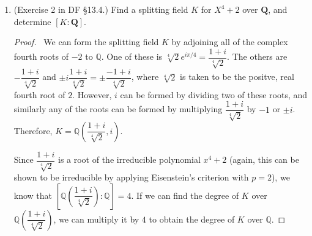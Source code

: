 \documentclass[10pt]{article}
\newcommand{\Q}{\mathbb{Q}}
\begin{document}
\begin{enumerate}[leftmargin=0cm,itemindent=.5cm,labelwidth=\itemindent,labelsep=0cm,align=left]
\begin{proof}
Define a map $\varphi : \dfrac{F[x]}{\big(f(x) \big)} \rightarrow \dfrac{F[x]}{\big(h(x) \big)}$ by $\overline{p(x)} \mapsto \overline{p(g(x))}$.  To show this map is well-defined, assume $p(x) \in \big( f(x) \big)$, so that $p(x) = r(x)f(x)$ for some $r(x) \in F[x]$.  Thus, $p(g(x)) = r(g(x))f(g(x)) \in \big( h(x) \big)$ because $h(x) \mid f(g(x))$.

It is clear that $\varphi$ is a ring homomorphism: for any $p(x), q(x), r(x) \in F[x]$ we have $\varphi(p(x)q(x) + r(x)) = p(g(x))q(g(x)) + r(g(x)) = \varphi(p(x))\varphi(q(x)) + \varphi(r(x))$.

Now, assume for a contradiction that $\varphi$ is the zero map.  Then for the polynomial $p(x) = 1$, we have $\varphi(\overline{p(x)}) = \overline{p(g(x))} = \overline{1} = \big( h(x) \big)$.  So $h(x)$ is a unit in $F[x]$ and thus a constant polynomial, contraditing that it is irreducible.  So $\varphi$ is injective, and thus an isomorphism onto a subfield of $\dfrac{F[x]}{\big(h(x) \big)}$.  By the argument in the first paragraph, this completes the proof.

\end{proof}

\item (Exercise 2 in DF \S 13.4.) Find a splitting field $K$ for $X^4+2$ over $\mathbf{Q}$, and determine $[K:\mathbf{Q}]$.

\begin{proof}

\ We can form the splitting field $K$ by adjoining all of the complex fourth roots of $-2$ to $\Q$.  One of these is $\sqrt[4]{2} e^{i\pi/4} = \dfrac{1+i}{\sqrt[4]{2}}$.  The others are $ -\dfrac{1+i}{\sqrt[4]{2}}$ and $\pm i\dfrac{1+i}{\sqrt[4]{2}} = \pm \dfrac{-1+i}{\sqrt[4]{2}}$, where $\sqrt[4]{2}$ is taken to be the positve, real fourth root of $2$.  However, $i$ can be formed by dividing two of these roots, and similarly any of the roots can be formed by multiplying $\dfrac{1+i}{\sqrt[4]{2}}$ by $-1$ or $\pm i$.  Therefore, $K = \Q \left(\dfrac{1+i}{\sqrt[4]{2}}, i \right)$.

Since $\dfrac{1+i}{\sqrt[4]{2}}$ is a root of the irreducible polynomial $x^4 + 2$ (again, this can be shown to be irreducible by applying Eisenstein's criterion with $p = 2$), we know that $\left[ \Q \left( \dfrac{1+i}{\sqrt[4]{2}} \right) : \Q \right] = 4$.  If we can find the degree of $K$ over $\Q \left( \dfrac{1+i}{\sqrt[4]{2}} \right)$, we can multiply it by $4$ to obtain the degree of $K$ over $\Q$.


\end{proof}
\end{enumerate}
\end{document}
